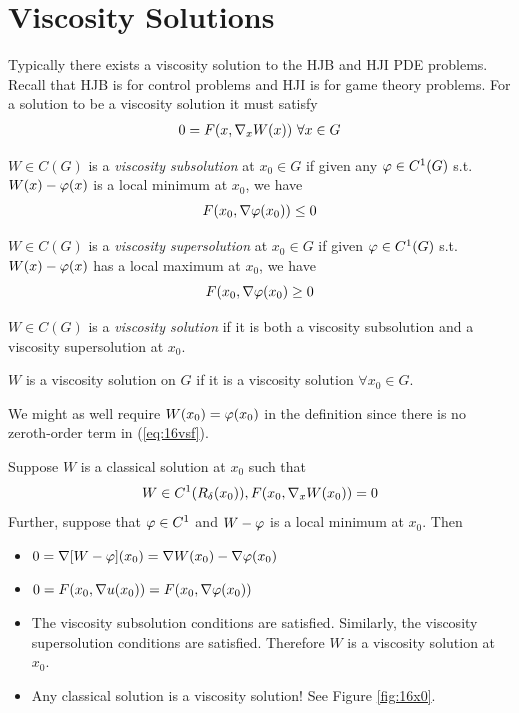 \section{Viscosity Solutions}
Typically there exists a viscosity solution to the HJB and HJI PDE problems. Recall that HJB is for control problems and HJI is for game theory problems. For a solution to be a viscosity solution it must satisfy
\begin{align}
\label{eq:16vsf}
0 = F(x,\nabla_xW(x)) ~\forall x\in G
\end{align}

\begin{definition}
$W\in C(G)$ is a \textit{viscosity subsolution} at $x_0\in G$ if given any $\varphi\in C^1(G)$ s.t. $W(x)-\varphi(x)$ is a local minimum at $x_0$, we have
$$F(x_0,\nabla\varphi(x_0))\leq0$$
\end{definition}

\begin{definition}
$W\in C(G)$ is a \textit{viscosity supersolution} at $x_0\in G$ if given $\varphi\in C^1(G)$ s.t. $W(x)-\varphi(x)$ has a local maximum at $x_0$, we have
$$F(x_0,\nabla\varphi(x_0)\geq0$$
\end{definition}

\begin{definition}
$W\in C(G)$ is a \textit{viscosity solution} if it is both a viscosity subsolution and a viscosity supersolution at $x_0$.
\end{definition}

\begin{definition}
$W$ is a viscosity solution on $G$ if it is a viscosity solution $\forall x_0\in G$.
\end{definition}

\begin{remark}
We might as well require $W(x_0)=\varphi(x_0)$ in the definition since there is no zeroth-order term in (\ref{eq:16vsf}).
\end{remark}

\begin{remark}
Suppose $W$ is a classical solution at $x_0$ such that
$$W\in C^1(R_\delta(x_0)), F(x_0,\nabla_xW(x_0))=0$$
Further, suppose that $\varphi\in C^1$ and $W-\varphi$ is a local minimum at $x_0$. Then
\begin{itemize}
\item $0 = \nabla[W-\varphi](x_0) = \nabla W(x_0)-\nabla\varphi(x_0)$
\item $0 = F(x_0,\nabla u(x_0)) = F(x_0,\nabla\varphi(x_0))$
\item The viscosity subsolution conditions are satisfied. Similarly, the viscosity supersolution conditions are satisfied. Therefore $W$ is a viscosity solution at $x_0$.
\item Any classical solution is a viscosity solution! See Figure \ref{fig:16x0}.
\end{itemize}
\end{remark}

